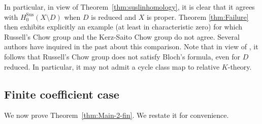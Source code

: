 \documentclass[11pt]{article}
\numberwithin{equation}{section}
\newcommand{\sus}{\mathrm{Sus}}
\theoremstyle{definition}
\newcommand{\thmref}{Theorem~\ref}
\begin{document}
In particular, in view of \thmref{thm:suslinhomology}, it is clear that it agrees with \hbox{$H_0^{\sus}(X\!\setminus\!D)$} when $D$ is reduced and $X$ is proper. Theorem \ref{thm:Failure} then exhibits explicitly an example
(at least in characteristic zero)
for which Russell's Chow group and the Kerz-Saito Chow group do not agree.
Several authors have inquired in the past about this comparison.
Note that in view of \cite[Th.\,1.1]{BKS}, it follows that Russell's Chow group does not satisfy Bloch's formula, even for $D$ reduced. In particular,
it may not admit a cycle class map to relative $K$-theory.

\subsection{Finite coefficient case}\label{sec:Main2-III}
We now prove \thmref{thm:Main-2-fin}. We restate it for convenience.
\end{document}
